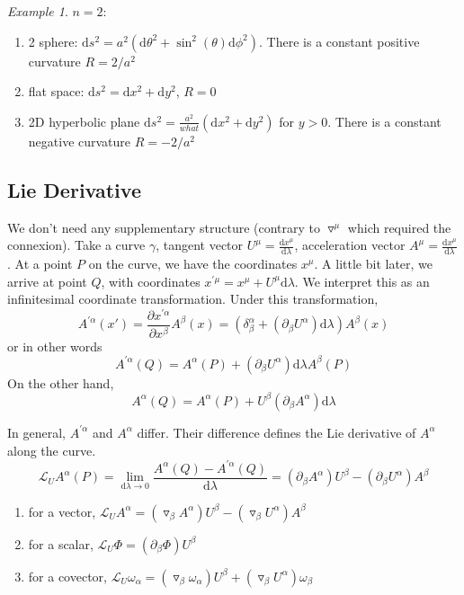 \documentclass[a4paper]{book}
\theoremstyle{definition}
\theoremstyle{remark}
\newtheorem*{example}{Example}
\begin{document}
\begin{example}
    $n = 2$:
    \begin{enumerate}
        \item 2 sphere: $\text{d}s^2 = a^2(\text{d}\theta^2 + \sin^2(\theta) \text{d}\phi^2)$. There is a constant positive curvature $R = 2/a^2$
        \item flat space: $\text{d}s^2 = \text{d}x^2 + \text{d}y^2$, $R = 0$
        \item 2D hyperbolic plane $\text{d}s^2 = \frac{a^2}{what}(\text{d}x^2 + \text{d}y^2)$ for $y>0$. There is a constant negative curvature $R = -2/a^2$
    \end{enumerate}
\end{example}

\subsection{Lie Derivative}
We don't need any supplementary structure (contrary to $\triangledown^\mu$ which required the connexion). Take a curve $\gamma$, tangent vector $U^\mu = \frac{\text{d}x^\mu}{\text{d}\lambda}$, acceleration vector $A^\mu = \frac{\text{d}x^\mu}{\text{d}\lambda}$. At a point $P$ on the curve, we have the coordinates $x^\mu$. A little bit later, we arrive at point $Q$, with coordinates $x^{'\mu} = x^\mu + U^\mu \text{d}\lambda$. We interpret this as an infinitesimal coordinate transformation. Under this transformation, 
\begin{equation}
    A^{'\alpha}(x') = \frac{\partial x^{'\alpha}}{\partial x^\beta} A^\beta (x) = (\delta^\alpha_\beta + (\partial_\beta U^\alpha)\text{d}\lambda) A^\beta(x)
\end{equation}
or in other words
\begin{equation}
    A^{'\alpha}(Q) = A^{\alpha}(P) + (\partial_\beta U^\alpha)\text{d}\lambda A^\beta(P)
\end{equation}
On the other hand, 
\begin{equation}
    A^\alpha(Q) = A^\alpha(P) + U^\beta (\partial_\beta A^\alpha)\text{d}\lambda
\end{equation}

In general, $A^{'\alpha}$ and $A^{\alpha}$ differ. Their difference defines the Lie derivative of $A^\alpha$ along the curve. 
\begin{equation}
    \mathcal{L}_U A^\alpha (P) = \lim_{\text{d}\lambda \rightarrow 0} \frac{A^\alpha(Q) - A^{'\alpha}(Q)}{\text{d}\lambda} = (\partial_\beta A^\alpha)U^\beta - (\partial_\beta U^\alpha) A^\beta
\end{equation}
\begin{enumerate}
    \item for a vector, $\mathcal{L}_U A^\alpha = (\triangledown _\beta A^\alpha)U^\beta - (\triangledown_\beta U^{\alpha})A^{\beta}$
    \item for a scalar, $\mathcal{L}_U\Phi = (\partial_\beta \Phi)U^\beta$
    \item for a covector, $\mathcal{L}_U \omega_\alpha = (\triangledown _\beta \omega_\alpha)U^\beta + (\triangledown_\beta U^{\alpha})\omega_{\beta}$
\end{enumerate}
\end{document}
